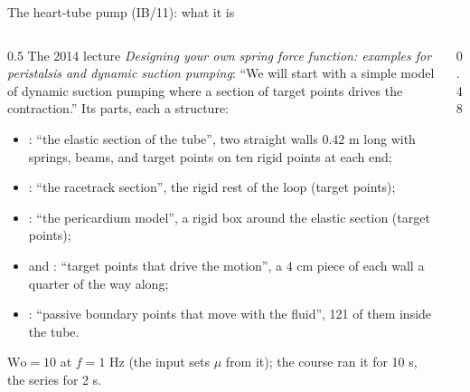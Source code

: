 \documentclass[aspectratio=169,11pt]{beamer}
\begin{document}
\begin{frame}{The heart-tube pump (IB/11): what it is}
\label{fr:pump}
\begin{columns}[T,onlytextwidth]
\begin{column}{0.5\textwidth}
\scriptsize The 2014 lecture \emph{Designing your own spring force function: examples for peristalsis and dynamic suction pumping}: ``We will start with a simple model of dynamic suction pumping where a section of target points drives the contraction.'' Its parts, each a structure:
\begin{itemize}
  \item {}: ``the elastic section of the tube'', two straight walls $0.42$ m long with springs, beams, and target points on ten rigid points at each end;
  \item {}: ``the racetrack section'', the rigid rest of the loop (target points);
  \item {}: ``the pericardium model'', a rigid box around the elastic section (target points);
  \item {} and : ``target points that drive the motion'', a $4$ cm piece of each wall a quarter of the way along;
  \item {}: ``passive boundary points that move with the fluid'', 121 of them inside the tube.
\end{itemize}
\scriptsize $\mathrm{Wo} = 10$ at $f = 1$ Hz (the input sets $\mu$ from it); the course ran it for 10 s, the series for 2 s.
\end{column}
\begin{column}{0.48\textwidth}
\centering
{}


\end{column}
\end{columns}
\end{frame}
\end{document}
